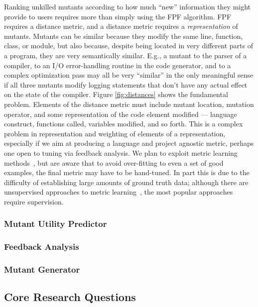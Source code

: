 Ranking unkilled mutants according to how much ``new'' information they might
provide to users requires more than simply using the FPF algorithm.
FPF requires a distance metric, and a distance metric requires a
\emph{representation} of mutants.  Mutants can be similar because they
modify the same line, function, class, or module, but also because,
despite being located in very different parts of a program, they are
very semantically similar.  E.g., a mutant to the parser of a compiler, to
an I/O error-handling routine in the code generator, and to a complex
optimization pass may all be very ``similar'' in the only meaningful
sense if all three mutants modify logging statements that don't have
any actual effect on the state of the compiler.  Figure
\ref{fig:distances} shows the fundamental problem.  Elements of the
distance metric must include mutant location, mutation operator, and
some representation of the code element modified --- language
construct, functions called, variables modified, and so forth.  This
is a complex problem in representation and weighting of elements of a
representation, especially if we aim at producing a language and
project agnostic metric, perhaps one open to tuning via feedback
analysis.  We plan to exploit metric learning
methods~\cite{kulis2012metric}, but are aware that to avoid over-fitting
to even a set of good examples, the final metric may have to be
hand-tuned.  In part this is due to the difficulty of establishing
large amounts of ground truth data; although there are unsupervised
approaches to metric learning~\cite{scholkopf1998nonlinear,tipping1999probabilistic}, the most popular approaches require supervision.

\subsubsection{Mutant Utility Predictor}

\subsubsection{Feedback Analysis}

\subsubsection{Mutant Generator}

\subsection{Core Research Questions}


